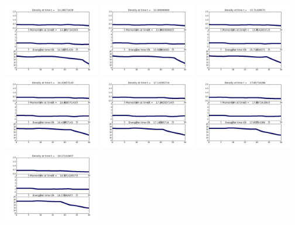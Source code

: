 \documentclass[11pt]{article}
\begin{document}
\vskip 10pt 
\includegraphics[width=0.316666666667\textwidth]{frame0020fig1.png}
\vskip 10pt 
\includegraphics[width=0.316666666667\textwidth]{frame0021fig1.png}
\vskip 10pt 
\includegraphics[width=0.316666666667\textwidth]{frame0022fig1.png}
\vskip 10pt 
\includegraphics[width=0.316666666667\textwidth]{frame0023fig1.png}
\vskip 10pt 
\includegraphics[width=0.316666666667\textwidth]{frame0024fig1.png}
\vskip 10pt 
\includegraphics[width=0.316666666667\textwidth]{frame0025fig1.png}
\vskip 10pt 
\includegraphics[width=0.316666666667\textwidth]{frame0026fig1.png}
\end{document}
